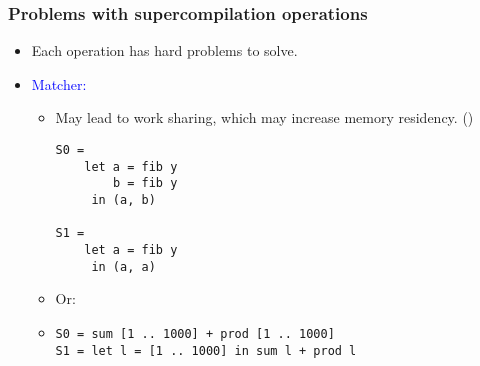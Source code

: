 \documentclass{beamer}
\begin{document}
\begin{frame}[fragile]
    \frametitle{Problems with supercompilation operations}

    \begin{itemize}[<+->]
        \item[]
            Each operation has hard problems to solve.

        \item[]
            \textcolor{blue}{Matcher:}
            \begin{itemize}
                \item[]
                    May lead to work sharing, which may increase memory
                    residency. (\citet{commonsubexpression})

                    \begin{verbatim}
S0 =
    let a = fib y
        b = fib y
     in (a, b)

S1 =
    let a = fib y
     in (a, a)
                    \end{verbatim}

                \item[]
                    Or:

                \item[]
                    \begin{verbatim}
S0 = sum [1 .. 1000] + prod [1 .. 1000]
S1 = let l = [1 .. 1000] in sum l + prod l
                    \end{verbatim}

            \end{itemize}
    \end{itemize}
\end{frame}
\end{document}

